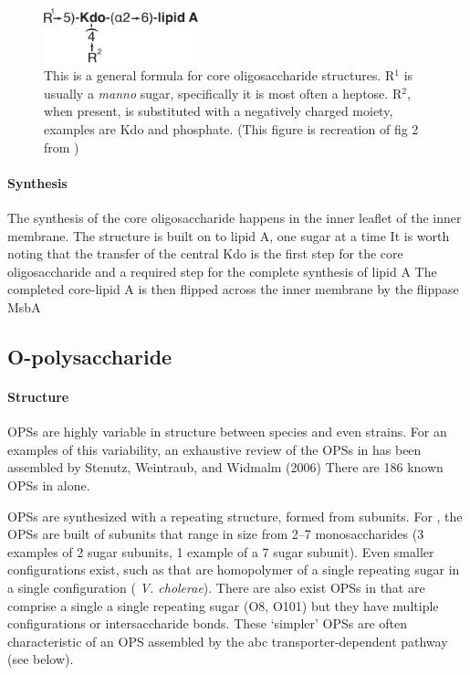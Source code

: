 \begin{figure}[htb]
  	\begin{center}
   		\includegraphics[width=0.4\textwidth]{intro/img/coreformula.pdf}
   	\end{center}
   	\caption[A generalized formula for core oligosaccharides]{This is a general formula for core oligosaccharide structures. R$^1$ is usually a \textit{manno} sugar, specifically
it is most often a heptose. R$^2$, when present, is substituted with a negatively charged moiety, examples are Kdo and phosphate. (This figure is recreation of fig 2 from
) }
\label{fig:coreformula}
\end{figure}

    \paragraph{Synthesis} The synthesis of the core oligosaccharide happens in the inner leaflet of the inner membrane. The structure is built on to lipid A, one sugar at a
time It is worth noting that the transfer of the central Kdo is the first step for the core oligosaccharide and a required step for the complete
synthesis of lipid A The completed core-lipid A is then flipped across the inner membrane by the flippase MsbA

  \subsection{O-polysaccharide}\label{sec:o-polysaccharide}

    \paragraph{Structure} \Acp{OPS} are highly variable in structure between species and even strains. For an examples of this variability, an exhaustive review of the \acp{OPS} in
\ecoli has been assembled by Stenutz, Weintraub, and Widmalm (2006) There are 186 known \acp{OPS} in \ecoli alone.

\Acp{OPS} are synthesized with a repeating structure, formed from subunits. For \ecoli, the \acp{OPS} are built of subunits that range in size from 2--7 monosaccharides (3 examples
of 2 sugar subunits, 1 example of a 7 sugar subunit). Even smaller configurations exist, such as that are homopolymer of a single repeating sugar in a single configuration (\eg
\textit{V. cholerae}). There are also exist \acp{OPS} in \ecoli that are comprise a single a single repeating sugar (O8, O101) but they have multiple
configurations or intersaccharide bonds. These `simpler' \acp{OPS} are often characteristic of an \ac{OPS} assembled by the \ac{abc} transporter-dependent pathway (see below).
 
